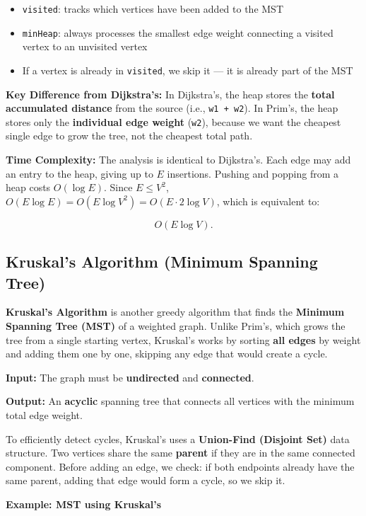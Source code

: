 \begin{itemize}
  \item \texttt{visited}: tracks which vertices have been added to the MST
  \item \texttt{minHeap}: always processes the smallest edge weight connecting a visited vertex to an unvisited vertex
  \item If a vertex is already in \texttt{visited}, we skip it --- it is already part of the MST
\end{itemize}

\textbf{Key Difference from Dijkstra's:} In Dijkstra's, the heap stores the \textbf{total accumulated distance} from the source (i.e., \texttt{w1 + w2}). In Prim's, the heap stores only the \textbf{individual edge weight} (\texttt{w2}), because we want the cheapest single edge to grow the tree, not the cheapest total path.

\textbf{Time Complexity:}
The analysis is identical to Dijkstra's. Each edge may add an entry to the heap, giving up to $E$ insertions. Pushing and popping from a heap costs $O(\log E)$. Since $E \leq V^2$, $O(E \log E) = O(E \log V^2) = O(E \cdot 2\log V)$, which is equivalent to:

\[
O(E \log V).
\]

\subsection{Kruskal's Algorithm (Minimum Spanning Tree)}

\textbf{Kruskal's Algorithm} is another greedy algorithm that finds the \textbf{Minimum Spanning Tree (MST)} of a weighted graph. Unlike Prim's, which grows the tree from a single starting vertex, Kruskal's works by sorting \textbf{all edges} by weight and adding them one by one, skipping any edge that would create a cycle.

\textbf{Input:} The graph must be \textbf{undirected} and \textbf{connected}.

\textbf{Output:} An \textbf{acyclic} spanning tree that connects all vertices with the minimum total edge weight.

To efficiently detect cycles, Kruskal's uses a \textbf{Union-Find (Disjoint Set)} data structure. Two vertices share the same \textbf{parent} if they are in the same connected component. Before adding an edge, we check: if both endpoints already have the same parent, adding that edge would form a cycle, so we skip it.

\textbf{Example: MST using Kruskal's}

